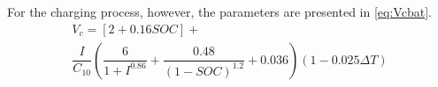 \documentclass[journal]{IEEEtran}
\begin{document}
%
%

For the charging process, however, the parameters are presented in \eqref{eq:Vcbat}.
%
\begin{multline}
\label{eq:Vcbat}
V_{c} = [2+0.16SOC]+ \\ \dfrac{I}{C_{10}} \left( \dfrac{6}{1+I^{0.86}} + \dfrac{0.48}{(1-SOC)^{1.2}} + 0.036  \right) (1-0.025 \Delta T)
\end{multline}
\end{document}
